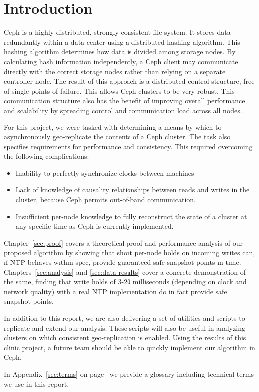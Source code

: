 \chapter{Introduction}
\label{sec:introduction}

Ceph is a highly distributed, strongly consistent file system. It
stores data redundantly within a data center using a distributed hashing
algorithm. This hashing algorithm determines how data is divided among
storage nodes.  By calculating hash information independently, a Ceph
client may communicate directly with the correct storage nodes rather
than relying on a separate controller node. The result of this
approach is a distributed control structure, free of single points of
failure. This allows Ceph clusters to be very robust. This
communication structure also has the benefit of improving overall
performance and scalability by spreading control and communication
load across all nodes.

For this project, we were tasked with determining a means by which to
asynchronously geo-replicate the contents of a Ceph cluster. The task
also specifies requirements for performance and consistency. This
required overcoming the following complications:

\begin{itemize}
\item Inability to perfectly synchronize clocks between machines
\item Lack of knowledge of causality relationships between reads and
  writes in the cluster, because Ceph permits out-of-band
  communication.
\item Insufficient per-node knowledge to fully reconstruct the state
  of a cluster at any specific time as Ceph is currently implemented.
\end{itemize}

Chapter~\ref{sec:proof} covers a theoretical proof and performance
analysis of our proposed algorithm by showing that short per-node holds on
incoming writes can, if NTP behaves within spec, provide guaranteed
safe snapshot points in time. Chapters~\ref{sec:analysis} and
\ref{sec:data-results} cover a concrete demonstration of the same,
finding that write holds of 3-20 milliseconds (depending on clock and
network quality) with a real NTP implementation do in fact provide
safe snapshot points. 

In addition to this report, we are also delivering a set of utilities
and scripts to replicate and extend our analysis. These scripts will
also be useful in analyzing clusters on which consistent
geo-replication is enabled. Using the results of this clinic project,
a future team should be able to quickly implement our algorithm in
Ceph.

In Appendix~\ref{sec:terms} on page~\pageref{sec:terms} we provide
a glossary including technical terms we use in this report.


